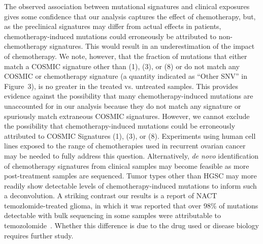 \documentclass[linenumbers]{bmcart}
\begin{document}

The observed association between mutational signatures and clinical exposures gives some confidence that our analysis captures the effect of chemotherapy, but, as the preclinical signatures may differ from actual effects in patients, chemotherapy-induced mutations could erroneously be attributed to non-chemotherapy signatures. This would result in an underestimation of the impact of chemotherapy. We note, however, that the fraction of mutations that either match a COSMIC signature other than (1), (3), or (8) or do not match any COSMIC or chemotherapy signature (a quantity indicated as ``Other SNV'' in Figure~3), is no greater in the treated vs. untreated samples. This provides evidence against the possibility that many chemotherapy-induced mutations are unaccounted for in our analysis because they do not match any signature or spuriously match extraneous COSMIC signatures. However, we cannot exclude the possibility that chemotherapy-induced mutations could be erroneously attributed to COSMIC Signatures (1), (3), or (8). Experiments using human cell lines exposed to the range of chemotherapies used in recurrent ovarian cancer may be needed to fully address this question. Alternatively, \textit{de novo} identification of chemotherapy signatures from clinical samples may become feasible as more post-treatment samples are sequenced. Tumor types other than HGSC may more readily show detectable levels of chemotherapy-induced mutations to inform such a deconvolution. A striking contrast our results is a report of NACT temozlomide-treated glioma, in which it was reported that over 98\% of mutations detectable with bulk sequencing in some samples were attributable to temozolomide~\cite{Johnson_2013}. Whether this difference is due to the drug used or disease biology requires further study.


\end{document}
